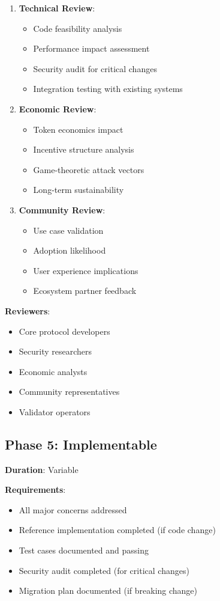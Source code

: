 \documentclass[11pt,a4paper]{article}
\begin{document}
\begin{enumerate}
\item \textbf{Technical Review}:
\begin{itemize}
\item Code feasibility analysis
\item Performance impact assessment
\item Security audit for critical changes
\item Integration testing with existing systems
\end{itemize}

\item \textbf{Economic Review}:
\begin{itemize}
\item Token economics impact
\item Incentive structure analysis
\item Game-theoretic attack vectors
\item Long-term sustainability
\end{itemize}

\item \textbf{Community Review}:
\begin{itemize}
\item Use case validation
\item Adoption likelihood
\item User experience implications
\item Ecosystem partner feedback
\end{itemize}
\end{enumerate}

\textbf{Reviewers}:
\begin{itemize}
\item Core protocol developers
\item Security researchers
\item Economic analysts
\item Community representatives
\item Validator operators
\end{itemize}

\subsection{Phase 5: Implementable}

\textbf{Duration}: Variable

\textbf{Requirements}:
\begin{itemize}
\item All major concerns addressed
\item Reference implementation completed (if code change)
\item Test cases documented and passing
\item Security audit completed (for critical changes)
\item Migration plan documented (if breaking change)
\end{itemize}
\end{document}
